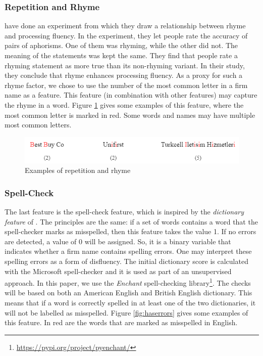 \documentclass[11pt]{article}
\begin{document}
\newpage
\subsubsection{Repetition and Rhyme}
\cite{mcglone2000birds} have done an experiment from which they draw a relationship between rhyme and processing fluency. In the experiment, they let people rate the accuracy of pairs of aphorisms. One of them was rhyming, while the other did not. The meaning of the statements was kept the same. They find that people rate a rhyming statement as more true than its non-rhyming variant. In their study, they conclude that rhyme enhances processing fluency. As a proxy for such a rhyme factor, we chose to use the number of the most common letter in a firm name as a feature. This feature (in combination with other features) may capture the rhyme in a word. Figure \ref{fig:repetitions} gives some examples of this feature, where the most common letter is marked in red. Some words and names may have multiple most common letters.

\vspace{0.5cm}
\begin{figure}[h]
    \centering
    \includegraphics[scale=0.6]{figures/repetition.png}
    \caption{Examples of repetition and rhyme}
    \label{fig:repetitions}
\end{figure}


\subsubsection{Spell-Check}
The last feature is the spell-check feature, which is inspired by the \textit{dictionary feature} of \cite{green2013company}. The principles are the same: if a set of words contains a word that the spell-checker marks as misspelled, then this feature takes the value 1. If no errors are detected, a value of 0 will be assigned. So, it is a binary variable that indicates whether a firm name contains spelling errors. One may interpret these spelling errors as a form of disfluency. The initial dictionary score is calculated with the Microsoft spell-checker and it is used as part of an unsupervised approach. In this paper, we use the \textit{Enchant} spell-checking library\footnote{\url{https://pypi.org/project/pyenchant/}}. The checks will be based on both an American English and British English dictionary. This means that if a word is correctly spelled in at least one of the two dictionaries, it will not be labelled as misspelled. Figure \ref{fig:haserrors} gives some examples of this feature. In red are the words that are marked as misspelled in English.
\end{document}
